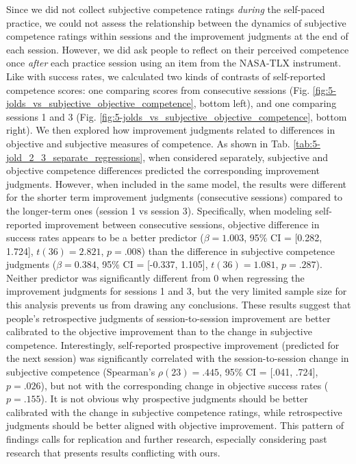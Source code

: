 Since we did not collect subjective competence ratings \emph{during} the self-paced practice, we could not assess the relationship between the dynamics of subjective competence ratings within sessions and the improvement judgments at the end of each session. However, we did ask people to reflect on their perceived competence once \emph{after} each practice session using an item from the NASA-TLX instrument. Like with success rates, we calculated two kinds of contrasts of self-reported competence scores: one comparing scores from consecutive sessions (Fig. \ref{fig:5-jolds_vs_subjective_objective_competence}, bottom left), and one comparing sessions 1 and 3 (Fig. \ref{fig:5-jolds_vs_subjective_objective_competence}, bottom right). We then explored how improvement judgments related to differences in objective and subjective measures of competence. As shown in Tab. \ref{tab:5-jold_2_3_separate_regressions}, when considered separately, subjective and objective competence differences predicted the corresponding improvement judgments. However, when included in the same model, the results were different for the shorter term improvement judgments (consecutive sessions) compared to the longer-term ones (session 1 vs session 3). Specifically, when modeling self-reported improvement between consecutive sessions, objective difference in success rates appears to be a better predictor ($\beta = 1.003$, 95\% CI = [0.282, 1.724], $t(36) = 2.821$, $p = .008$) than the difference in subjective competence judgments ($\beta = 0.384$, 95\% CI = [-0.337, 1.105], $t(36) = 1.081$, $p = .287$). Neither predictor was significantly different from 0 when regressing the improvement judgments for sessions 1 and 3, but the very limited sample size for this analysis prevents us from drawing any conclusions. These results suggest that people's retrospective judgments of session-to-session improvement are better calibrated to the objective improvement than to the change in subjective competence. Interestingly, self-reported prospective improvement (predicted for the next session) was significantly correlated with the session-to-session change in subjective competence (Spearman's $\rho(23) = .445$, 95\% CI = [.041, .724], $p = .026$), but not with the corresponding change in objective success rates ($p = .155$). It is not obvious why prospective judgments should be better calibrated with the change in subjective competence ratings, while retrospective judgments should be better aligned with objective improvement. This pattern of findings calls for replication and further research, especially considering past research \parencite{townsend_metacognitive_2011} that presents results conflicting with ours.

